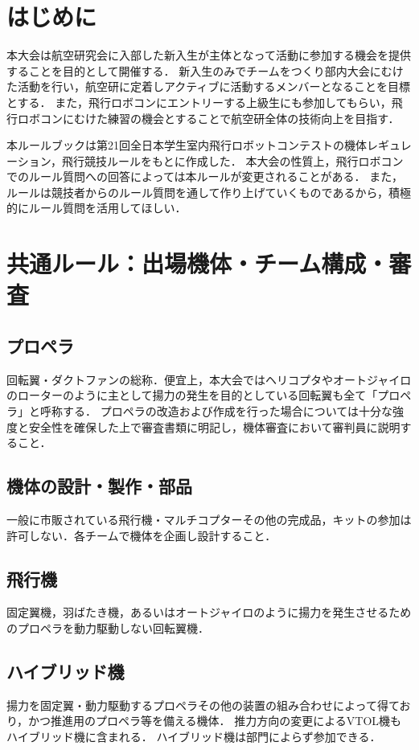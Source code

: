 \documentclass[a4paper,12pt,oneside]{jsarticle}
\begin{document}

\newpage
\tableofcontents
\newpage

\section{はじめに}
本大会は航空研究会に入部した新入生が主体となって活動に参加する機会を提供することを目的として開催する．
新入生のみでチームをつくり部内大会にむけた活動を行い，航空研に定着しアクティブに活動するメンバーとなることを目標とする．
また，飛行ロボコンにエントリーする上級生にも参加してもらい，飛行ロボコンにむけた練習の機会とすることで航空研全体の技術向上を目指す．


本ルールブックは第21回全日本学生室内飛行ロボットコンテストの機体レギュレーション，飛行競技ルールをもとに作成した．
本大会の性質上，飛行ロボコンでのルール質問への回答によっては本ルールが変更されることがある．
また，ルールは競技者からのルール質問を通して作り上げていくものであるから，積極的にルール質問を活用してほしい．

\section{共通ルール：出場機体・チーム構成・審査}
\subsection{プロペラ}
回転翼・ダクトファンの総称．便宜上，本大会ではヘリコプタやオートジャイロのローターのように主として揚力の発生を目的としている回転翼も全て「プロペラ」と呼称する．
プロペラの改造および作成を行った場合については十分な強度と安全性を確保した上で審査書類に明記し，機体審査において審判員に説明すること．

\subsection{機体の設計・製作・部品}
一般に市販されている飛行機・マルチコプターその他の完成品，キットの参加は許可しない．各チームで機体を企画し設計すること．

\subsection{飛行機}
固定翼機，羽ばたき機，あるいはオートジャイロのように揚力を発生させるためのプロペラを動力駆動しない回転翼機．
\subsection{ハイブリッド機}
揚力を固定翼・動力駆動するプロペラその他の装置の組み合わせによって得ており，かつ推進用のプロペラ等を備える機体．
推力方向の変更によるVTOL機もハイブリッド機に含まれる．
ハイブリッド機は部門によらず参加できる．
\end{document}
